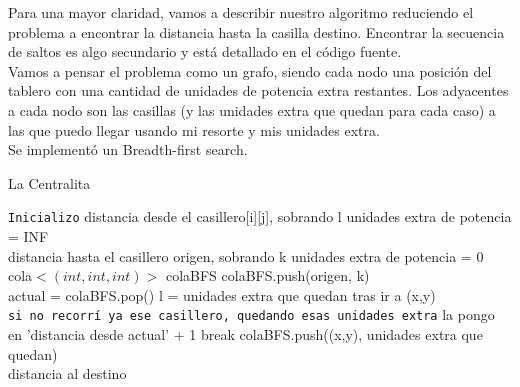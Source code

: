 \documentclass[11pt, a4paper, twoside]{article}
\begin{document}
{}
Para una mayor claridad, vamos a describir nuestro algoritmo reduciendo el problema a encontrar la distancia
hasta la casilla destino. Encontrar la secuencia de saltos es algo secundario y está detallado en el código fuente.\\
Vamos a pensar el problema como un grafo, siendo cada nodo una posición del tablero con una cantidad de unidades 
de potencia extra restantes. Los adyacentes a cada nodo son las casillas (y las unidades extra que quedan para 
cada caso) a las que puedo llegar usando mi resorte y mis unidades extra. \\
Se implementó un Breadth-first search. \\

\begin{algorithm}[H]
\caption{La Centralita}\label{alg:ej3-centralita}
\begin{algorithmic}[1]

\Statex \texttt{Inicializo}
	  
		\State distancia desde el casillero[i][j], sobrando l unidades extra de potencia = INF
	\EndFor \\

\State distancia hasta el casillero origen, sobrando k unidades extra de potencia = 0 \\
\State cola$<(int, int, int)>$ colaBFS
\State colaBFS.push(origen, k) \\

   
\State actual = colaBFS.pop()
		    \State l = unidades extra que quedan tras ir a (x,y) \\
			\Statex \hspace{1cm} \texttt{si no recorrí ya ese casillero, quedando esas unidades extra}
				\State   la pongo en 'distancia desde actual' + 1
					\State break
				\EndIf
				\State colaBFS.push((x,y), unidades extra que quedan)
			\EndIf	
	\EndFor		
\EndWhile
\\
\State \Return distancia al destino

\end{algorithmic}
\end{algorithm}
\end{document}
